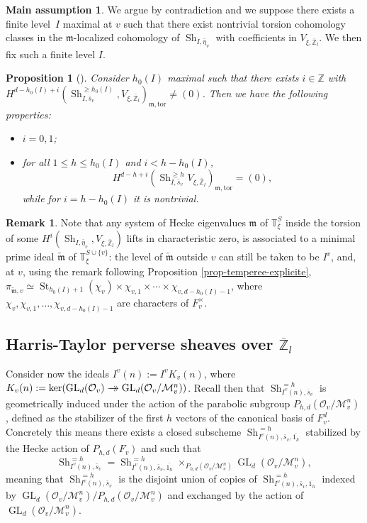 \documentclass[JEP,XML,SOM,Unicode,published]{cedram}
\newcommand{\onto}{\mathchoice{\to\hspace*{-5mm}\to}{\to\hspace*{-2.85mm}\to}{\to\hspace*{-3mm}\to}{\to\hspace*{-3mm}\to}}
\DeclareMathOperator{\GL}{GL}
\newcommand{\tor}{\mathrm{tor}}
\theoremstyle{plain}
\newtheorem{prop}[equation]{Proposition}
\theoremstyle{definition}
\newtheorem*{remark}{Remark}
\newtheorem*{mainassumption}{Main assumption}
\numberwithin{equation}{subsection}
\newcommand\Tm{{\mathbb T}}
\newcommand\Zm{{\mathbb Z}}
\newcommand\MC{{\mathcal M}}
\newcommand\OC{{\mathcal O}}
\DeclareMathOperator{\sh}{Sh}
\DeclareMathOperator{\st}{St}
\begin{document}
\begin{mainassumption}
We argue by contradiction and we suppose there exists a finite level~$I$ maximal at $v$
such that there
exist nontrivial torsion cohomology classes in the $\mathfrak m$-localized cohomology of
$\sh_{I,\bar \eta_v}$ with coefficients in $V_{\xi,\overline \Zm_l}$.
We then fix such a finite level $I$.
\end{mainassumption}

\begin{prop}[{\cf \cite[Lem.\,4.13]{boyer-imj}}] \label{prop-h0I}
Consider $h_0(I)$ maximal such that there exists $i \in \Zm$ with
$H^{d-h_0(I)+i}(\sh_{I,\bar s_v}^{\geq h_0(I)}, V_{\xi,\overline \Zm_l})_{\mathfrak m,\tor}
\neq (0)$. Then we have the following properties:
\begin{itemize}
\item $i=0,1$;

\item for all $1 \leq h \leq h_0(I)$ and $i<h-h_0(I)$,
\[
H^{d-h+i}(\sh_{I,\bar s_v}^{\geq h} V_{\xi,\overline \Zm_l})_{\mathfrak m,\tor} =(0),
\]
while for $i=h-h_0(I)$ it is nontrivial.
\end{itemize}
\end{prop}

\begin{remark}
Note that any system of Hecke eigenvalues
$\mathfrak m$ of $\Tm^S_\xi$ inside the torsion of some
$H^i(\sh_{I,\bar \eta_v},V_{\xi,\overline \Zm_l})$ lifts in characteristic zero, \ie is associated to a minimal prime ideal $\widetilde{\mathfrak m}$ of
$\Tm^{S \cup \{v\}}_{\xi}$: the level of $\widetilde{\mathfrak m}$ outside $v$ can still
be taken to be $I^v$, and, at $v$, using the remark following Proposition
\ref{prop-temperee-explicite}, $\pi_{\widetilde{\mathfrak m},v} \simeq
\st_{h_0(I)+1}(\chi_v) \times \chi_{v,1} \times \cdots \times \chi_{v,d-h_0(I)-1}$,
where $\chi_v, \chi_{v,1},\dots, \chi_{v,d-h_0(I)-1}$ are characters of $F_v^\times$.
\end{remark}

\subsection{Harris-Taylor perverse sheaves over $\overline \Zm_l$}
\label{para-HT}

Consider now the ideals $I^v(n):=I^vK_v(n)$, where
$K_v(n):=\ker(\GL_d(\OC_v) \onto \GL_d(\OC_v/\MC_v^n))$.
Recall then that $\sh_{I^v(n),\bar s_v}^{=h}$ is geometrically induced
under the action of the parabolic subgroup $P_{h,d}(\OC_v/\MC_v^n)$, defined as the
stabilizer of the first $h$ vectors of the canonical basis of $F_v^d$. Concretely this means there
exists a closed subscheme $\sh_{I^v(n),\bar s_v,\overline{1_{h}}}^{=h}$ stabilized by the Hecke
action of $P_{h,d}(F_v)$ and such that
\[
\sh_{I^v(n),\bar s_v}^{=h} = \sh_{I^v(n),\bar s_v,\overline{1_{h}}}^{=h}
\times_{P_{h,d}(\OC_v/\MC_v^n)} \GL_d(\OC_v/\MC_v^n),
\]
meaning that $\sh_{I^v(n),\bar s_v}^{=h} $ is the disjoint union of copies of
$\sh_{I^v(n),\bar s_v,\overline{1_{h}}}^{=h}$ indexed by
$\GL_d(\OC_v/\MC_v^n)/P_{h,d}(\OC_v/\MC_v^n)$ and
exchanged by the action of
$\GL_d(\OC_v/\MC_v^n)$.
\end{document}
